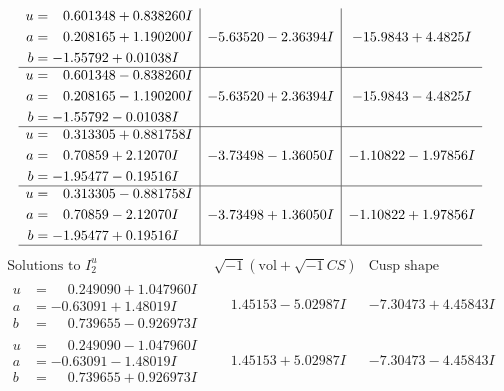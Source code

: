 \documentclass[1p]{elsarticle_modified}
\theoremstyle{definition}
\newcommand{\I}{\sqrt{-1}}
\begin{document}
$$\begin{array}{c|c|c}
\begin{aligned}
u &= \phantom{-}0.601348 + 0.838260 I \\
a &= \phantom{-}0.208165 + 1.190200 I \\
b &= -1.55792 + 0.01038 I\end{aligned}
 & -5.63520 - 2.36394 I & -15.9843 + 4.4825 I \\ \hline\begin{aligned}
u &= \phantom{-}0.601348 - 0.838260 I \\
a &= \phantom{-}0.208165 - 1.190200 I \\
b &= -1.55792 - 0.01038 I\end{aligned}
 & -5.63520 + 2.36394 I & -15.9843 - 4.4825 I \\ \hline\begin{aligned}
u &= \phantom{-}0.313305 + 0.881758 I \\
a &= \phantom{-}0.70859 + 2.12070 I \\
b &= -1.95477 - 0.19516 I\end{aligned}
 & -3.73498 - 1.36050 I & -1.10822 - 1.97856 I \\ \hline\begin{aligned}
u &= \phantom{-}0.313305 - 0.881758 I \\
a &= \phantom{-}0.70859 - 2.12070 I \\
b &= -1.95477 + 0.19516 I\end{aligned}
 & -3.73498 + 1.36050 I & -1.10822 + 1.97856 I\\
 \hline 
 \end{array}$$\newpage$$\begin{array}{c|c|c}  
\text{Solutions to }I^u_{2}& \I (\text{vol} + \sqrt{-1}CS) & \text{Cusp shape}\\
 \hline 
\begin{aligned}
u &= \phantom{-}0.249090 + 1.047960 I \\
a &= -0.63091 + 1.48019 I \\
b &= \phantom{-}0.739655 - 0.926973 I\end{aligned}
 & \phantom{-}1.45153 - 5.02987 I & -7.30473 + 4.45843 I \\ \hline\begin{aligned}
u &= \phantom{-}0.249090 - 1.047960 I \\
a &= -0.63091 - 1.48019 I \\
b &= \phantom{-}0.739655 + 0.926973 I\end{aligned}
 & \phantom{-}1.45153 + 5.02987 I & -7.30473 - 4.45843 I \\ \hline\begin{aligned}

\end{aligned}
\end{array}$$
\end{document}
